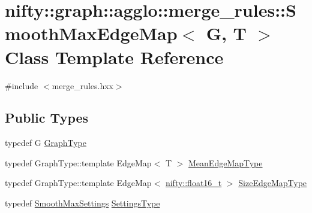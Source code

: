 \hypertarget{classnifty_1_1graph_1_1agglo_1_1merge__rules_1_1SmoothMaxEdgeMap}{}\section{nifty\+:\+:graph\+:\+:agglo\+:\+:merge\+\_\+rules\+:\+:Smooth\+Max\+Edge\+Map$<$ G, T $>$ Class Template Reference}
\label{classnifty_1_1graph_1_1agglo_1_1merge__rules_1_1SmoothMaxEdgeMap}


{\ttfamily \#include $<$merge\+\_\+rules.\+hxx$>$}

\subsection*{Public Types}
\begin{DoxyCompactItemize}
\item 
typedef G \hyperlink{classnifty_1_1graph_1_1agglo_1_1merge__rules_1_1SmoothMaxEdgeMap_a30c83f3e3f699c7060a9e9605672246b}{Graph\+Type}
\item 
typedef Graph\+Type\+::template Edge\+Map$<$ T $>$ \hyperlink{classnifty_1_1graph_1_1agglo_1_1merge__rules_1_1SmoothMaxEdgeMap_ac0fe8dbcb9cc4baa5aff9614e0ddd13d}{Mean\+Edge\+Map\+Type}
\item 
typedef Graph\+Type\+::template Edge\+Map$<$ \hyperlink{namespacenifty_a20031b62bd5c16b943905d43a8ed361a}{nifty\+::float16\+\_\+t} $>$ \hyperlink{classnifty_1_1graph_1_1agglo_1_1merge__rules_1_1SmoothMaxEdgeMap_a27bfa4de7c16550e9028903d774c705d}{Size\+Edge\+Map\+Type}
\item 
typedef \hyperlink{structnifty_1_1graph_1_1agglo_1_1merge__rules_1_1SmoothMaxSettings}{Smooth\+Max\+Settings} \hyperlink{classnifty_1_1graph_1_1agglo_1_1merge__rules_1_1SmoothMaxEdgeMap_a0f463ebc561d6770fa59b4168e4acf98}{Settings\+Type}
\end{DoxyCompactItemize}
